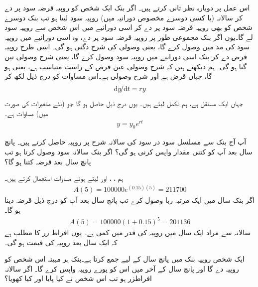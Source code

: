  اس عمل پر دوبارہ نظر ثانی کرتے ہیں۔ اگر بنک  ایک شخص کو     روپیہ  قرضہ سود پر دے کر سالانہ (یا کسی دوسرے مخصوص دورانیہ میں)  روپیہ سود لیتا ہو تب  بنک  دوسرے شخص کو بھی       روپیہ قرضہ  سود پر دے کر  اسی دورانیے میں اس شخص سے   روپیہ سود  لے گا۔یوں    اگر بنک مجموعی طور پر          روپیہ قرضہ  سود پر دے،  وہ    اسی دورانیے میں    روپیہ سود   کی مد میں وصول کرے گا، یعنی وصولی کی شرح دگنی ہو گی۔ اسی طرح  روپیہ  قرض دے کر بنک اسی دورانیے میں  روپیہ سود وصول کرے گا، یعنی شرح وصولی تین گنا ہو گی۔ ہم دیکھتے ہیں کہ شرح وصولی عین قرض کے راست متناسب ہے، یعنی  ہو گا، جہاں   قرض ہے اور  شرح وصولی ہے۔اس مساوات کو  درج ذیل لکھ کر
\begin{align*}
\dif y\!/\!\dif t=ry
\end{align*}
جہاں   ایک مستقل ہے، ہم تکمل لیتے ہیں۔ یوں درج ذیل حاصل ہو گا جو  (نئے متغیرات کی صورت میں) مساوات  ہے۔
\begin{align*}
y=y_0e^{rt}
\end{align*}

آپ آج بنک سے مسلسل سود در سود کی سالانہ  شرح پر  روپیہ حاصل کرتے ہیں۔ پانچ سال بعد آپ کو کتنی مقدار واپس کرنی ہو گی؟ اگر بنک سالانہ سود وصول کرتا ہو تب پانچ سال بعد قرضہ کتنا ہو گا؟

ہم ، ،  اور  لیتے ہوئے مساوات  استعمال کرتے ہیں۔
\begin{align*}
A(5)=\num{100000}e^{(0.15)(5)}=\num{211700}
\end{align*}
اگر بنک سال میں ایک مرتبہ  ربا وصول کرے تب پانچ سال بعد آپ کو درج ذیل قرضہ دینا ہو گا۔
\begin{align*}
A(5)=\num{100000}(1+0.15)^5=\num{201136}
\end{align*}
سالانہ  سے مراد ایک سال میں روپیہ کی قدر میں کمی ہے۔ یوں  افراط زر کا مطلب ہے کہ ایک سال بعد روپیہ کی قیمت  ہو گی۔

 ایک شخص  روپیہ بنک میں پانچ سال کے لیے جمع کرتا ہے۔بنک ہر مہینہ اس شخص کو  روپیہ دے گا اور پانچ سال کے آخر میں اس کو پورے  روپیہ واپس کرے گا۔ اگر سالانہ افراطزر      ہو تب اس شخص نے کیا پایا اور کیا کھویا؟

